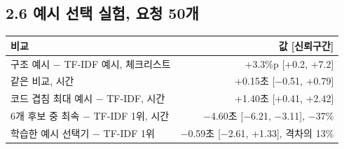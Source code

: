 \documentclass[10pt,a4paper]{article}
\begin{document}
\subsection*{2.6 예시 선택 실험, 요청 50개}
\begin{table}[H]\centering\small
\begin{tabular}{lr}
\toprule
비교 & 값 [신뢰구간]\\
\midrule
구조 예시 − TF-IDF 예시, 체크리스트 & +3.3\%p [+0.2, +7.2]\\
같은 비교, 시간 & +0.15초 [−0.51, +0.79]\\
코드 겹침 최대 예시 − TF-IDF, 시간 & +1.40초 [+0.41, +2.42]\\
6개 후보 중 최속 − TF-IDF 1위, 시간 & −4.60초 [−6.21, −3.11], −37\%\\
학습한 예시 선택기 − TF-IDF 1위 & −0.59초 [−2.61, +1.33], 격차의 13\%\\
\bottomrule
\end{tabular}
\end{table}
\end{document}
